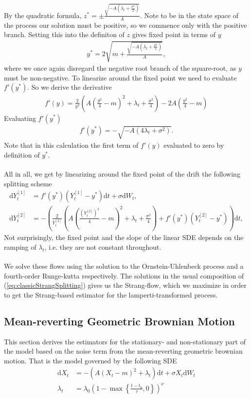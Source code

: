 By the quadratic formula, $z^* = \pm\frac{\sqrt{-A\left(\lambda_t + \frac{\sigma^2}{2}\right)}}{A}$. Note to be in the state space of the process our solution must be positive, so we commence only with the positive branch. Setting this into the definiton of $z$ gives fixed point in terms of $y$
\begin{align}
    y^* = 2\sqrt{m + \frac{\sqrt{-A\left(\lambda_t + \frac{\sigma^2}{4}\right)}}{A}},
\end{align}
where we once again disregard the negative root branch of the square-root, as $y$ must be non-negative. To linearize around the fixed point we need to evaluate $f'(y^*)$. So we derive the derivative
\begin{align}
    f'(y) = \frac{2}{y^2}\left(A\left(\frac{y^2}{4}-m\right)^2 + \lambda_t + \frac{\sigma^2}{4}\right) - 2A\left(\frac{y^2}{4} - m\right)
\end{align}
Evaluating $f'(y^*)$
\begin{align}
    f'(y^*) = -\sqrt{-A\left(4\lambda_t + \sigma^2\right)}.
\end{align}
Note that in this calculation the first term of $f'(y)$ evaluated to zero by definition of $y^*$.\\\\
All in all, we get by linearizing around the fixed point of the drift the following splitting scheme
\begin{align}
    \mathrm{d}Y_t^{[1]} &= f'(y^*)\left(Y_t^{[1]} - y^*\right)\mathrm{d}t + \sigma \mathrm{d}W_t, \label{eq:lampertiSquarerootSplitting1}\\
    \mathrm{d}Y_t^{[2]} &= - \left(\frac{2}{Y_t^{[2]}}\left(A\left(\frac{\left(Y_t^{[2]}\right)^2}{4} - m\right)^2 + \lambda_t + \frac{\sigma^2}{4}\right) + f'(y^*)\left(Y_t^{[2]} - y^*\right)\right)\mathrm{d}t,
\end{align}
Not surprisingly, the fixed point and the slope of the linear SDE depends on the ramping of $\lambda_t$, i.e. they are not constant throughout. \\\\
We solve these flows using the solution to the Ornstein-Uhlenbeck process and a fourth-order Runge-kutta respectively. The solutions in the usual composition of (\ref{eq:classicStrangSplitting}) gives us the Strang-flow, which we maximize in order to get the Strang-based estimator for the lamperti-transformed process.
\newpage
\subsection{Mean-reverting Geometric Brownian Motion}\label{subsec:meanrevertingGBM}
This section derives the estimators for the stationary- and non-stationary part of the model based on the noise term from the mean-reverting geometric brownian motion. That is the model governed by the following SDE
\begin{align}
    \mathrm{d}X_t &= -\left(A\left(X_t - m\right)^2 + \lambda_t\right)\mathrm{d}t + \sigma X_t \mathrm{d}W_t\\
    \lambda_t &= \lambda_0\left(1 - \max\left\{\frac{t - t_0}{\tau}, 0\right\}\right)^\nu
\end{align}
